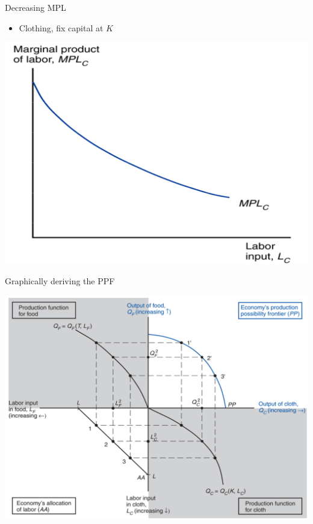 \documentclass[ignorenonframetext,]{beamer}
\begin{document}
\begin{frame}{Decreasing MPL}

    \begin{itemize}
        \item Clothing, fix capital at $K$
    \end{itemize}
    \includegraphics[scale=0.20]{cloth_mpl.png}

\end{frame}

\begin{frame}{Graphically deriving the PPF}

    \includegraphics[scale=0.25]{ppf.png}

\end{frame}
\end{document}
